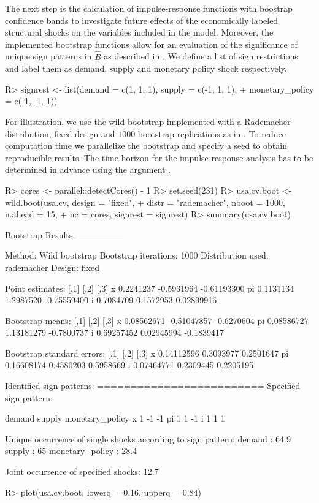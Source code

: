 \documentclass[nojss]{jss}\usepackage[]{graphicx}\usepackage[]{color}
\begin{document}
The next step is the calculation of impulse-response functions with boostrap confidence bands to investigate future effects of the
economically labeled structural shocks on the variables included in the model. Moreover, the implemented bootstrap functions allow for an evaluation of the significance of unique sign patterns in $\widehat{B}$ as described in \cite{HerwartzLDI2018}. We define a list of sign restrictions and label them as demand, supply and monetary policy shock respectively.
\begin{CodeChunk}
\begin{CodeInput}
R> signrest <- list(demand = c(1, 1, 1), supply = c(-1, 1, 1),
+    monetary_policy = c(-1, -1, 1))
\end{CodeInput}
\end{CodeChunk}
For illustration, we use the wild bootstrap implemented with a Rademacher distribution, fixed-design and $1000$ bootstrap replications as in \cite{HerwartzPloedt2016}. To reduce computation time we parallelize the bootstrap and specify a seed to obtain reproducible results. The time horizon for the impulse-response analysis has to be determined in advance using the argument .
\begin{CodeChunk}
\begin{CodeInput}
R> cores <- parallel::detectCores() - 1
R> set.seed(231)
R> usa.cv.boot <- wild.boot(usa.cv, design = "fixed",
+  distr = "rademacher", nboot = 1000, n.ahead = 15,
+  nc = cores, signrest = signrest)
R> summary(usa.cv.boot)
\end{CodeInput}
\begin{CodeOutput}
Bootstrap Results
-----------------

Method: Wild bootstrap
Bootstrap iterations: 1000
Distribution used: rademacher
Design: fixed

Point estimates:
        [,1]       [,2]        [,3]
x  0.2241237 -0.5931964 -0.61193300
pi 0.1131134  1.2987520 -0.75559400
i  0.7084709  0.1572953  0.02899916

Bootstrap means:
         [,1]        [,2]       [,3]
x  0.08562671 -0.51047857 -0.6270604
pi 0.08586727  1.13181279 -0.7800737
i  0.69257452  0.02945994 -0.1839417

Bootstrap standard errors:
         [,1]      [,2]      [,3]
x  0.14112596 0.3093977 0.2501647
pi 0.16608174 0.4580203 0.5958669
i  0.07464771 0.2309445 0.2205195

Identified sign patterns:
=========================
Specified sign pattern:

   demand supply monetary_policy
x       1     -1              -1
pi      1      1              -1
i       1      1               1

Unique occurrence of single shocks according to sign pattern:
demand : 64.9 %
supply : 65 %
monetary_policy : 28.4 %

Joint occurrence of specified shocks: 12.7 %
\end{CodeOutput}
\begin{CodeInput}
R> plot(usa.cv.boot, lowerq = 0.16, upperq = 0.84)
\end{CodeInput}
\end{CodeChunk}
\end{document}
